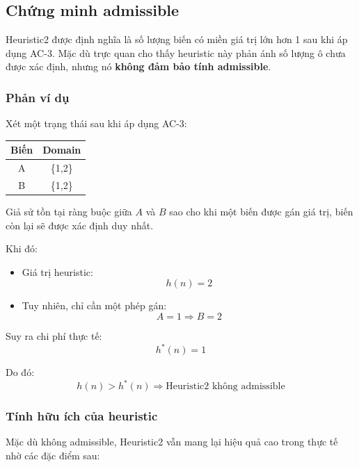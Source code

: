 \subsection{Chứng minh admissible}

Heuristic2 được định nghĩa là số lượng biến có miền giá trị lớn hơn 1 sau khi áp dụng AC-3. Mặc dù trực quan cho thấy heuristic này phản ánh số lượng ô chưa được xác định, nhưng nó \textbf{không đảm bảo tính admissible}.
\subsubsection{Phản ví dụ}
Xét một trạng thái sau khi áp dụng AC-3:

\begin{center}
\begin{tabular}{|c|c|}
\hline
Biến & Domain \\
\hline
A & \{1,2\} \\
B & \{1,2\} \\
\hline
\end{tabular}
\end{center}

Giả sử tồn tại ràng buộc giữa $A$ và $B$ sao cho khi một biến được gán giá trị, biến còn lại sẽ được xác định duy nhất.

Khi đó:
\begin{itemize}
    \item Giá trị heuristic:
    \[
    h(n) = 2
    \]
    \item Tuy nhiên, chỉ cần một phép gán:
    \[
    A = 1 \Rightarrow B = 2
    \]
\end{itemize}

Suy ra chi phí thực tế:
\[
h^*(n) = 1
\]

Do đó:
\[
h(n) > h^*(n)
\Rightarrow \text{Heuristic2 không admissible}
\]

\subsubsection{Tính hữu ích của heuristic}

Mặc dù không admissible, Heuristic2 vẫn mang lại hiệu quả cao trong thực tế nhờ các đặc điểm sau:

